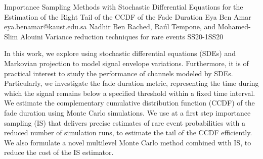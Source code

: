 \begin{talk}
  {Importance Sampling Methods with Stochastic Differential Equations for the Estimation of the Right Tail of the CCDF of the Fade Duration}%
  {Eya Ben Amar}%
  {}%
  {eya.benamar@kaust.edu.sa}%
  {Nadhir Ben Rached, Ra\'ul Tempone, and Mohamed-Slim Alouini}%
{Variance reduction techniques for rare events}
{}{SS20-1}{SS20}

			
In this work, we explore using stochastic differential equations (SDEs) and Markovian projection to model signal envelope variations. Furthermore, it is of practical interest to study the performance of channels modeled by SDEs. Particularly, we investigate the fade duration metric, representing the time during which the signal remains below a specified threshold within a fixed time interval. We estimate the complementary cumulative distribution function (CCDF) of the fade duration using Monte Carlo simulations. We use at a first step importance sampling (IS) that delivers precise estimates of rare event probabilities with a reduced number of simulation runs, to estimate the tail of the CCDF efficiently. We also formulate a novel multilevel Monte Carlo method combined with IS, to reduce the cost of the IS estimator. 

\medskip

\end{talk}


